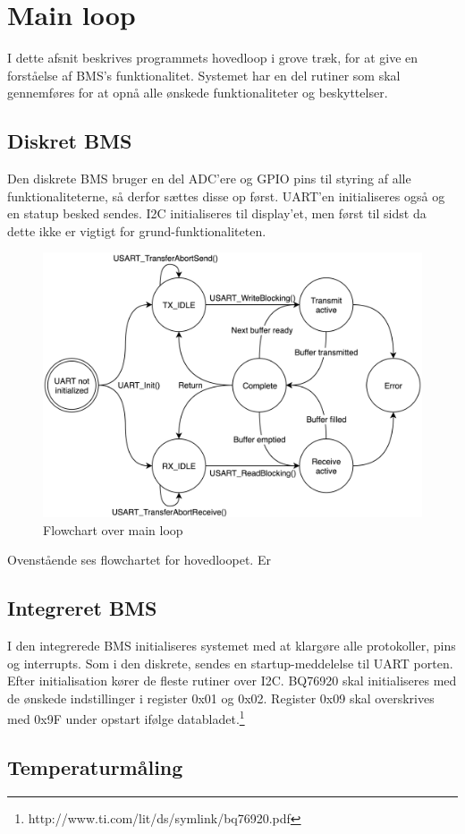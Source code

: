 \section{Main loop}
I dette afsnit beskrives programmets hovedloop i grove træk, for at give en forståelse af BMS's funktionalitet. Systemet har en del rutiner som skal gennemføres for at opnå alle ønskede funktionaliteter og beskyttelser. 

\subsection{Diskret BMS}
Den diskrete BMS bruger en del ADC'ere og GPIO pins til styring af alle funktionaliteterne, så derfor sættes disse op først. UART'en initialiseres også og en statup besked sendes. I2C initialiseres til display'et, men først til sidst da dette ikke er vigtigt for grund-funktionaliteten. \\

\begin{figure}[h]
	\centering
	\includegraphics[width=14cm]{billeder/UART_sm.png}
	\caption{Flowchart over main loop}
	\label{fig:main_loop}
\end{figure}
Ovenstående ses flowchartet for hovedloopet. Er

\subsection{Integreret BMS}
I den integrerede BMS initialiseres systemet med at klargøre alle protokoller, pins og interrupts. Som i den diskrete, sendes en startup-meddelelse til UART porten. Efter initialisation kører de fleste rutiner over I2C. BQ76920 skal initialiseres med de ønskede indstillinger i register 0x01 og 0x02. Register 0x09 skal overskrives med 0x9F under opstart ifølge databladet.\footnote{http://www.ti.com/lit/ds/symlink/bq76920.pdf} \\

\subsection{Temperaturmåling}
